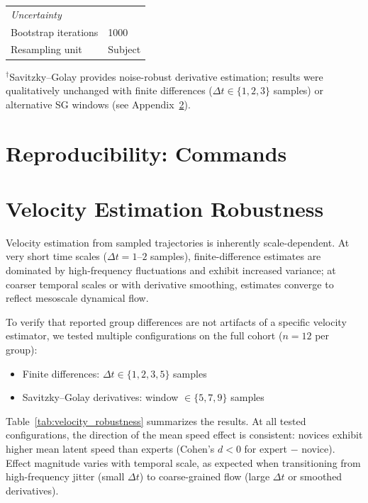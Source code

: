 \documentclass[5p,twocolumn,authoryear]{elsarticle}
\begin{document}
\begin{table}[h]
\begin{tabular}{ll}
\midrule
\multicolumn{2}{l}{\emph{Uncertainty}} \\
Bootstrap iterations & 1000 \\
Resampling unit & Subject \\
\bottomrule
\end{tabular}
\begin{flushleft}
\footnotesize{$^\dagger$Savitzky--Golay provides noise-robust derivative estimation; results were qualitatively unchanged with finite differences ($\Delta t \in \{1,2,3\}$ samples) or alternative SG windows (see Appendix~\ref{app:velocity_robustness}).}
\end{flushleft}
\end{table}

\section{Reproducibility: Commands}

\section{Velocity Estimation Robustness}
\label{app:velocity_robustness}

Velocity estimation from sampled trajectories is inherently scale-dependent. At very short time scales ($\Delta t = 1$--$2$ samples), finite-difference estimates are dominated by high-frequency fluctuations and exhibit increased variance; at coarser temporal scales or with derivative smoothing, estimates converge to reflect mesoscale dynamical flow.

To verify that reported group differences are not artifacts of a specific velocity estimator, we tested multiple configurations on the full cohort ($n = 12$ per group):
\begin{itemize}
    \item Finite differences: $\Delta t \in \{1, 2, 3, 5\}$ samples
    \item Savitzky--Golay derivatives: window $\in \{5, 7, 9\}$ samples
\end{itemize}

Table~\ref{tab:velocity_robustness} summarizes the results. At all tested configurations, the direction of the mean speed effect is consistent: novices exhibit higher mean latent speed than experts (Cohen's $d < 0$ for expert $-$ novice). Effect magnitude varies with temporal scale, as expected when transitioning from high-frequency jitter (small $\Delta t$) to coarse-grained flow (large $\Delta t$ or smoothed derivatives).
\end{document}
